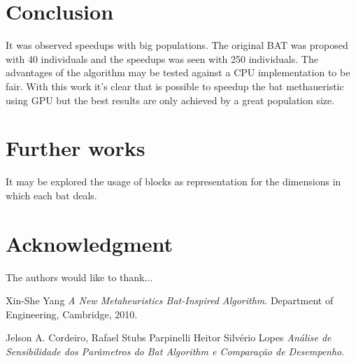 \documentclass[conference]{IEEEtran}
\begin{document}




\section{Conclusion}

It was observed speedups with big populations. The original BAT was proposed with 40 individuals and the speedups was seen with 250 individuals.
The advantages of the algorithm may be tested against a CPU implementation to be fair.
With this work it's clear that is possible to speedup the bat methaueristic using GPU but the best results are only achieved by a great population size.

\section{Further works}

It may be explored the usage of blocks as representation for the dimensions in which each bat deals.







\section*{Acknowledgment}


The authors would like to thank...
\begin{thebibliography}{1}

    Xin-She Yang \emph{A New Metaheuristics Bat-Inspired Algorithm}. Department of Engineering, Cambridge, 2010.

    Jelson A. Cordeiro, Rafael Stubs Parpinelli Heitor Silvério Lopes \emph{Análise de Sensibilidade dos Parâmetros do Bat Algorithm e Comparação de Desempenho}.

\end{thebibliography}

\end{document}
